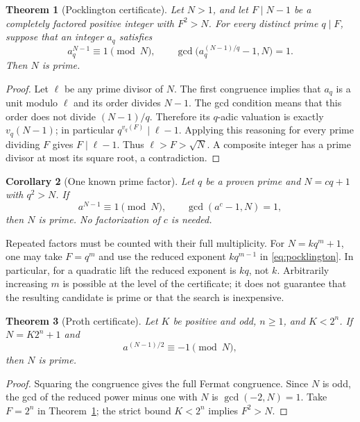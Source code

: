 \documentclass[11pt,a4paper]{article}
\newtheorem{theorem}{Theorem}[section]
\newtheorem{corollary}[theorem]{Corollary}
\theoremstyle{definition}\newtheorem{definition}[theorem]{Definition}
\theoremstyle{remark}\newtheorem{remark}[theorem]{Remark}
\begin{document}
\begin{theorem}[Pocklington certificate]\label{thm:pocklington}
Let $N>1$, and let $F\mid N-1$ be a completely factored positive integer
with $F^2>N$. For every distinct prime $q\mid F$, suppose that an integer
$a_q$ satisfies
\begin{equation}\label{eq:pocklington}
 a_q^{N-1}\equiv1\pmod N,
 \qquad
 \gcd\bigl(a_q^{(N-1)/q}-1,N\bigr)=1.
\end{equation}
Then $N$ is prime.
\end{theorem}
\begin{proof}
Let $\ell$ be any prime divisor of $N$. The first congruence implies that
$a_q$ is a unit modulo $\ell$ and its order divides $N-1$. The gcd
condition means that this order does not divide $(N-1)/q$. Therefore its
$q$-adic valuation is exactly $v_q(N-1)$; in particular
$q^{v_q(F)}\mid\ell-1$. Applying this reasoning for every prime dividing
$F$ gives $F\mid\ell-1$. Thus $\ell>F>\sqrt N$. A composite integer has
a prime divisor at most its square root, a contradiction.
\end{proof}

\begin{corollary}[One known prime factor]\label{cor:linear}
Let $q$ be a proven prime and $N=cq+1$ with $q^2>N$. If
\[
 a^{N-1}\equiv1\pmod N,\qquad\gcd(a^c-1,N)=1,
\]
then $N$ is prime. No factorization of $c$ is needed.
\end{corollary}

Repeated factors must be counted with their full multiplicity. For
$N=kq^m+1$, one may take $F=q^m$ and use the reduced exponent
$kq^{m-1}$ in \eqref{eq:pocklington}. In particular, for a quadratic lift
the reduced exponent is $kq$, not $k$. Arbitrarily increasing $m$ is
possible at the level of the certificate; it does not guarantee that the
resulting candidate is prime or that the search is inexpensive.

\begin{theorem}[Proth certificate]\label{thm:proth}
Let $K$ be positive and odd, $n\geq1$, and $K<2^n$. If
$N=K2^n+1$ and
\begin{equation}\label{eq:proth}
 a^{(N-1)/2}\equiv-1\pmod N,
\end{equation}
then $N$ is prime.
\end{theorem}
\begin{proof}
Squaring the congruence gives the full Fermat congruence. Since $N$ is
odd, the gcd of the reduced power minus one with $N$ is
$\gcd(-2,N)=1$. Take $F=2^n$ in Theorem~\ref{thm:pocklington}; the strict
bound $K<2^n$ implies $F^2>N$.
\end{proof}
\end{document}
